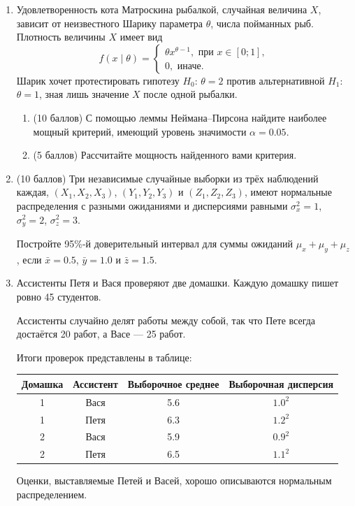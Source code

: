 \begin{enumerate}
	\item Удовлетворенность кота Матроскина рыбалкой, случайная величина $X$, зависит от неизвестного Шарику параметра $\theta$, числа пойманных рыб. 
	Плотность величины $X$ имеет вид 
	\[
	f(x \mid \theta) = \begin{cases}
	\theta x^{\theta-1}, \text{ при } x\in [0;1], \\
	0, \text{ иначе.}
	\end{cases}
	\]
	Шарик хочет протестировать гипотезу $H_0$: $\theta = 2$ против альтернативной $H_1$: $\theta=1$, зная лишь значение $X$ после одной рыбалки. 
	\begin{enumerate}
	\item (10 баллов) С помощью леммы Неймана–Пирсона найдите наиболее мощный критерий, имеющий уровень значимости $\alpha=0.05$.
	\item (5 баллов) Рассчитайте мощность найденного вами критерия.
	\end{enumerate}
		
	\item (10 баллов) Три независимые случайные выборки из трёх наблюдений каждая, $(X_1, X_2, X_3)$, $(Y_1, Y_2, Y_3)$ и $(Z_1, Z_2, Z_3)$,
	имеют нормальные распределения с разными ожиданиями и дисперсиями равными $\sigma^2_x=1$, $\sigma^2_y=2$, $\sigma^2_z=3$. 
	
	Постройте 95\%-й доверительный интервал для суммы ожиданий $\mu_x + \mu_y + \mu_z$, если $\bar x= 0.5$, $\bar y= 1.0$ и $\bar z= 1.5$.
	
	
	\item Ассистенты Петя и Вася проверяют две домашки.
	Каждую домашку пишет ровно 45 студентов.
	
	Ассистенты случайно делят работы между собой, так что Пете всегда достаётся 20 работ, а Васе — 25 работ.
	
	Итоги проверок представлены в таблице:
	
	\begin{tabular}{cccc}
	\toprule
	Домашка & Ассистент & Выборочное среднее & Выборочная дисперсия \\
	\midrule 
	1 & Вася & 5.6 & $1.0^2$ \\
	1 & Петя & 6.3 & $1.2^2$ \\
	2 & Вася & 5.9 & $0.9^2$ \\
	2 & Петя & 6.5 & $1.1^2$ \\
	\bottomrule
	\end{tabular}
	
	Оценки, выставляемые Петей и Васей, хорошо описываются нормальным распределением.
	

\end{enumerate}
